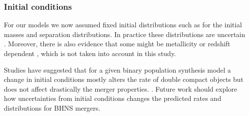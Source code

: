 \documentclass[twocolumn]{aastex63}
\begin{document}






\subsubsection{Initial conditions}
For our models we now assumed fixed initial distributions such as for the initial masses and separation distributions. In practice these distributions are uncertain \citep[e.g.,][]{2018Sci...359...69S}. Moreover, there is also evidence that some might  be metallicity or redshift dependent \citep[e.g.,][]{2018ApJ...855...20G}, which is not taken into account in this study. 

Studies have suggested that for a given binary population synthesis model a change in initial conditions mostly alters the rate of double compact objects but  does not affect drastically the merger properties. \citep{2015ApJ...814...58D}.
Future work should explore how uncertainties from initial conditions changes the predicted rates and distributions for BHNS mergers. 



%
%
%
%
\end{document}
